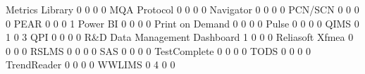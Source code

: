 \documentclass{article}
\begin{document}
\begin{Schunk}
\begin{Soutput}
  Metrics Library                                              0   0   0    0
  MQA Protocol                                                 0   0   0    0
  Navigator                                                    0   0   0    0
  PCN/SCN                                                      0   0   0    0
  PEAR                                                         0   0   0    1
  Power BI                                                     0   0   0    0
  Print on Demand                                              0   0   0    0
  Pulse                                                        0   0   0    0
  QIMS                                                         0   1   0    3
  QPI                                                          0   0   0    0
  R&D Data Management Dashboard                                1   0   0    0
  Reliasoft Xfmea                                              0   0   0    0
  RSLMS                                                        0   0   0    0
  SAS                                                          0   0   0    0
  TestComplete                                                 0   0   0    0
  TODS                                                         0   0   0    0
  TrendReader                                                  0   0   0    0
  WWLIMS                                                       0   4   0    0
                                                           

\end{Soutput}
\end{Schunk}
\end{document}
